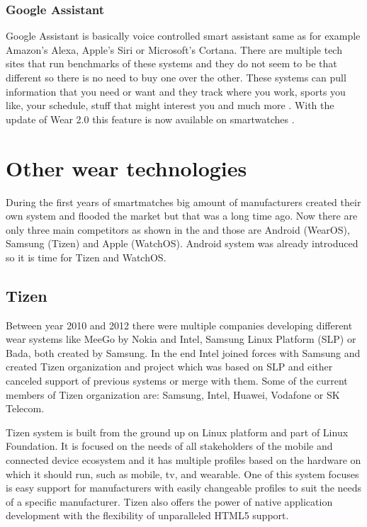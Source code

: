 \subsubsection{Google Assistant}\label{sec:GoogleAssistant}
Google Assistant is basically voice controlled smart assistant same as for example Amazon's Alexa, Apple's Siri or Microsoft's Cortana. There are multiple tech sites that run benchmarks of these systems \cite{ASGA, VACCGASAB, CAGACS, GASBAC} and they do not seem to be that different so there is no need to buy one over the other. These systems can pull information that you need or want and they track where you work, sports you like, your schedule, stuff that might interest you and much more \cite{WIGA}. With the update of Wear 2.0 this feature is now available on smartwatches \cite{AW2UG, AW2WN}.

\section{Other wear technologies}\label{sec:OtherWearTechnologies}
During the first years of smartmatches big amount of manufacturers created their own system and flooded the market but that was a long time ago. Now there are only three main competitors as shown in the  and those are Android (WearOS), Samsung (Tizen) and Apple (WatchOS). Android system was already introduced so it is time for Tizen and WatchOS.

\subsection{Tizen}\label{sec:Tizen}
Between year 2010 and 2012 there were multiple companies developing different wear systems like MeeGo by Nokia and Intel, Samsung Linux Platform (SLP) or Bada, both created by Samsung. In the end Intel joined forces with Samsung and created Tizen organization and project which was based on SLP and either canceled support of previous systems or merge with them. Some of the current members of Tizen organization are: Samsung, Intel, Huawei, Vodafone or SK Telecom.

Tizen system is built from the ground up on Linux platform and part of Linux Foundation. It is focused on the needs of all stakeholders of the mobile and connected device ecosystem and it has multiple profiles based on the hardware on which it should run, such as mobile, tv, and wearable. One of this system focuses is easy support for manufacturers with easily changeable profiles to suit the needs of a specific manufacturer. Tizen also offers the power of native application development with the flexibility of unparalleled HTML5 support.

